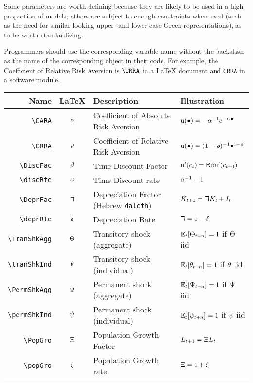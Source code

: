 
  Some parameters are worth defining because they are likely to be
  used in a high proportion of models; others are subject to enough
  constraints when used (such as the need for similar-looking upper-
  and lower-case Greek representations), as to be worth standardizing.

Programmers should
use the corresponding variable name without the backslash as the name of the corresponding object
in their code.  For example, the Coefficient of Relative Risk Aversion is $\verb|\CRRA|$ in a LaTeX
document and \texttt{CRRA} in a software module.

\begin{table}[h]
	\centering
	\begin{tabular}{||>{\ttfamily}rcll||}
		\hline
		 Name    & LaTeX         & Description & Illustration
  \\ \hline
     \verb|\CARA|        & $\alpha$       & Coefficient of Absolute Risk Aversion &${\mathrm{u}}(\bullet)=-\alpha^{-1} e^{-\alpha \bullet}$
  \\ \verb|\CRRA|        & $\rho$       & Coefficient of Relative Risk Aversion & ${\mathrm{u}}(\bullet)=(1-\rho)^{-1}\bullet^{1-\rho}$
  \\ \verb|\DiscFac|     & $\beta$    & Time Discount Factor & ${\mathrm{u}}^{\prime}(c_{t}) =  \mathsf{R} \beta {\ensuremath{\mathrm{u}}}^{\prime}(c_{t+1})$
  \\ \verb|\discRte|     & $\omega$    & Time Discount rate & $\beta^{-1}-1$
  \\ \verb|\DeprFac|     & $\daleth$    & Depreciation Factor (Hebrew \texttt{daleth}) & ${K}_{t+1} = \daleth {K}_{t}+I_{t}$
  \\ \verb|\deprRte|     & $\delta$    & Depreciation Rate & $\daleth = 1-\delta$
  \\ \verb|\TranShkAgg|  & $\Theta$ & Transitory shock (aggregate) & $\operatorname{\mathbb{E}}_{t}[\Theta_{t+n}]=1$ if $\Theta$ iid
  \\ \verb|\tranShkInd|  & $\theta$ & Transitory shock (individual) &  $\operatorname{\mathbb{E}}_{t}[\theta_{t+n}]=1$ if $\theta$ iid
  \\ \verb|\PermShkAgg|  & $\Psi$ & Permanent shock (aggregate) & $\operatorname{\mathbb{E}}_{t}[\Psi_{t+n}]=1$ if $\Psi$ iid
  \\ \verb|\permShkInd|  & $\psi$ & Permanent shock (individual) & $\operatorname{\mathbb{E}}_{t}[\psi_{t+n}]=1$ if $\psi$ iid
  \\ \verb|\PopGro|  & $\Xi$ & Population Growth Factor & $L_{t+1} = \Xi L_{t}$
  \\ \verb|\popGro|  & $\xi$ & Population Growth rate & $\Xi = 1 + \xi$

\end{tabular}
\end{table}
